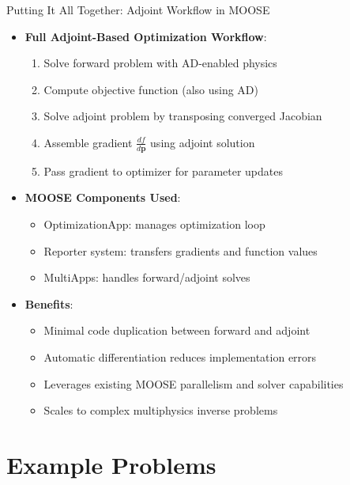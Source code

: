 \documentclass[10pt,aspectratio=169]{beamer}
\begin{document}
\begin{frame}{Putting It All Together: Adjoint Workflow in MOOSE}
    \begin{itemize}
        \item \textbf{Full Adjoint-Based Optimization Workflow}:
        \begin{enumerate}
            \item Solve forward problem with AD-enabled physics
            \item Compute objective function (also using AD)
            \item Solve adjoint problem by transposing converged Jacobian
            \item Assemble gradient $\frac{df}{d\mathbf{p}}$ using adjoint solution
            \item Pass gradient to optimizer for parameter updates
        \end{enumerate}
        
        \item \textbf{MOOSE Components Used}:
        \begin{itemize}
            \item OptimizationApp: manages optimization loop
            \item Reporter system: transfers gradients and function values
            \item MultiApps: handles forward/adjoint solves
     
        \end{itemize}
        
        \item \textbf{Benefits}:
        \begin{itemize}
            \item Minimal code duplication between forward and adjoint
            \item Automatic differentiation reduces implementation errors
            \item Leverages existing MOOSE parallelism and solver capabilities
            \item Scales to complex multiphysics inverse problems
        \end{itemize}
    \end{itemize}
\end{frame}



\section{Example Problems}
\end{document}
